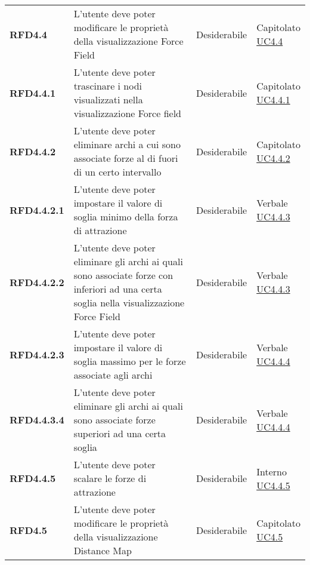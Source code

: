 \begin{longtable}[H]{>{\raggedright\bfseries}m{20mm} >{\raggedright}m{90mm} >{\raggedright}m{28mm} >{\raggedright\arraybackslash}m{30mm}}
    RFD4.4
    & L'utente deve poter modificare le proprietà della visualizzazione Force Field
    & Desiderabile
    & \makecell{ Capitolato \\ \hyperref[ssub:uc4.4]{UC4.4} }\\

    RFD4.4.1
    & L'utente deve poter trascinare i nodi visualizzati nella visualizzazione Force field
    & Desiderabile
    & \makecell{ Capitolato \\ \hyperref[par:uc4.4.1]{UC4.4.1} }\\

    RFD4.4.2
    & L'utente deve poter eliminare archi a cui sono associate forze al di fuori di un certo intervallo
    & Desiderabile
    & \makecell{ Capitolato \\ \hyperref[par:uc4.4.2]{UC4.4.2} }\\

    RFD4.4.2.1
    & L'utente deve poter impostare il valore di soglia minimo della forza di attrazione
    & Desiderabile
    & \makecell{ Verbale \\ \hyperref[par:uc4.4.3]{UC4.4.3} }\\

    RFD4.4.2.2
    & L'utente deve poter eliminare gli archi ai quali sono associate forze con inferiori ad una certa soglia
    nella visualizzazione Force Field
    & Desiderabile
    & \makecell{ Verbale \\ \hyperref[par:uc4.4.3]{UC4.4.3} }\\


    RFD4.4.2.3
    & L'utente deve poter impostare il valore di soglia massimo per le forze associate agli archi
    & Desiderabile
    & \makecell{ Verbale \\ \hyperref[par:uc4.4.4]{UC4.4.4} }\\

    RFD4.4.3.4
    & L'utente deve poter eliminare gli archi ai quali sono associate forze superiori ad una certa soglia
    & Desiderabile
    & \makecell{ Verbale \\ \hyperref[par:uc4.4.4]{UC4.4.4} }\\

    RFD4.4.5
    & L'utente deve poter scalare le forze di attrazione
    & Desiderabile
    & \makecell{ Interno \\ \hyperref[par:uc4.4.5]{UC4.4.5} }\\

    RFD4.5
    & L'utente deve poter modificare le proprietà della visualizzazione Distance Map
    & Desiderabile
    & \makecell{ Capitolato \\ \hyperref[ssub:uc4.5]{UC4.5} }\\


\end{longtable}
